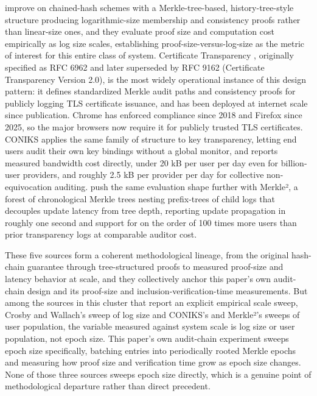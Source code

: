 \cite{crosby2009} improve on chained-hash schemes with a Merkle-tree-based, history-tree-style structure producing logarithmic-size membership and consistency proofs rather than linear-size ones, and they evaluate proof size and computation cost empirically as log size scales, establishing proof-size-versus-log-size as the metric of interest for this entire class of system. Certificate Transparency \cite{laurie2013}, originally specified as RFC 6962 and later superseded by RFC 9162 (Certificate Transparency Version 2.0), is the most widely operational instance of this design pattern: it defines standardized Merkle audit paths and consistency proofs for publicly logging TLS certificate issuance, and has been deployed at internet scale since publication. Chrome has enforced compliance since 2018 and Firefox since 2025, so the major browsers now require it for publicly trusted TLS certificates. CONIKS \cite{melara2015} applies the same family of structure to key transparency, letting end users audit their own key bindings without a global monitor, and reports measured bandwidth cost directly, under 20 kB per user per day even for billion-user providers, and roughly 2.5 kB per provider per day for collective non-equivocation auditing. \cite{hu2021} push the same evaluation shape further with Merkle², a forest of chronological Merkle trees nesting prefix-trees of child logs that decouples update latency from tree depth, reporting update propagation in roughly one second and support for on the order of 100 times more users than prior transparency logs at comparable auditor cost.

These five sources form a coherent methodological lineage, from the original hash-chain guarantee through tree-structured proofs to measured proof-size and latency behavior at scale, and they collectively anchor this paper's own audit-chain design and its proof-size and inclusion-verification-time measurements. But among the sources in this cluster that report an explicit empirical scale sweep, Crosby and Wallach's sweep of log size and CONIKS's and Merkle²'s sweeps of user population, the variable measured against system scale is log size or user population, not epoch size. This paper's own audit-chain experiment sweeps epoch size specifically, batching entries into periodically rooted Merkle epochs and measuring how proof size and verification time grow as epoch size changes. None of those three sources sweeps epoch size directly, which is a genuine point of methodological departure rather than direct precedent.

